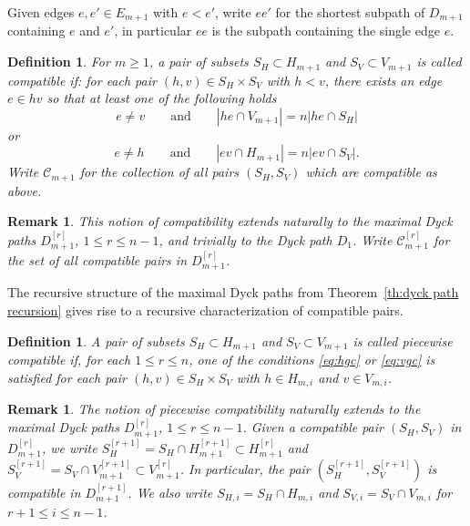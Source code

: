 \documentclass{amsart}
\newtheorem{definition}[theorem]{Definition}
\newtheorem{remark}[theorem]{Remark}
\numberwithin{equation}{section}
\newcommand{\cC}{\mathcal{C}}
\begin{document}
Given edges $e,e'\in E_{m+1}$ with $e<e'$, write $ee'$ for the shortest subpath of $D_{m+1}$ containing $e$ and $e'$, in particular $ee$ is the subpath containing the single edge $e$.
\begin{definition}
  \label{def:compatibility}
  For $m\ge1$, a pair of subsets $S_H\subset H_{m+1}$ and $S_V\subset V_{m+1}$ is called \emph{compatible} if: 
  for each pair $(h,v)\in S_H\times S_V$ with $h<v$, there exists an edge $e\in hv$ so that at least one of the following holds
  \begin{equation}
    \label{eq:hgc}
    e\ne v\qquad\text{and}\qquad |he\cap V_{m+1}|=n|he\cap S_H|
  \end{equation}
  or
  \begin{equation}
    \label{eq:vgc}
    e\ne h\qquad\text{and}\qquad |ev\cap H_{m+1}|=n|ev\cap S_V|.
  \end{equation}
  Write $\cC_{m+1}$ for the collection of all pairs $(S_H,S_V)$ which are compatible as above.
\end{definition}
\begin{remark}
  This notion of compatibility extends naturally to the maximal Dyck paths $D_{m+1}^{[r]}$, $1\le r\le n-1$, and trivially to the Dyck path $D_1$.
  Write $\cC_{m+1}^{[r]}$ for the set of all compatible pairs in $D_{m+1}^{[r]}$.
\end{remark}

The recursive structure of the maximal Dyck paths from Theorem~\ref{th:dyck path recursion} gives rise to a recursive characterization of compatible pairs.
\begin{definition}
  \cite[Definition 3.11]{rupel}
  \label{def:piecewise compatibility}
  A pair of subsets $S_H\subset H_{m+1}$ and $S_V\subset V_{m+1}$ is called \emph{piecewise compatible} if, for each $1\le r\le n$, one of the conditions \eqref{eq:hgc} or \eqref{eq:vgc} is satisfied for each pair $(h,v)\in S_H\times S_V$ with $h\in H_{m,i}$ and $v\in V_{m,i}$.
\end{definition}
\begin{remark}
  The notion of piecewise compatibility naturally extends to the maximal Dyck paths $D_{m+1}^{[r]}$, $1\le r\le n-1$.
  Given a compatible pair $(S_H,S_V)$ in $D_{m+1}^{[r]}$, we write $S_H^{[r+1]}=S_H\cap H_{m+1}^{[r+1]}\subset H_{m+1}^{[r]}$ and $S_V^{[r+1]}=S_V\cap V_{m+1}^{[r+1]}\subset V_{m+1}^{[r]}$.
  In particular, the pair $(S_H^{[r+1]},S_V^{[r+1]})$ is compatible in $D_{m+1}^{[r+1]}$.
  We also write $S_{H,i}=S_H\cap H_{m,i}$ and $S_{V,i}=S_V\cap V_{m,i}$ for $r+1\le i\le n-1$.
\end{remark}
\end{document}
